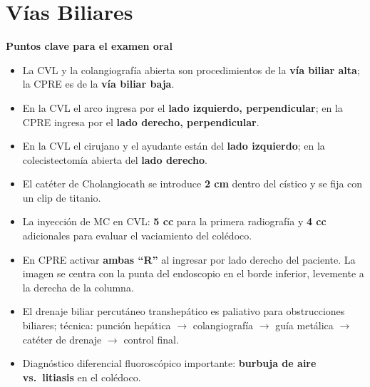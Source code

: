 
\chapter{Vías Biliares}

\begin{cajakeypoints}
	\textbf{\color{azulprincipal} Puntos clave para el examen oral}
	\begin{itemize}[noitemsep, topsep=2pt]
		\item La CVL y la colangiografía abierta son procedimientos de la \textbf{vía biliar alta}; la CPRE es de la \textbf{vía biliar baja}.
		\item En la CVL el arco ingresa por el \textbf{lado izquierdo, perpendicular}; en la CPRE ingresa por el \textbf{lado derecho, perpendicular}.
		\item En la CVL el cirujano y el ayudante están del \textbf{lado izquierdo}; en la colecistectomía abierta del \textbf{lado derecho}.
		\item El catéter de Cholangiocath se introduce \textbf{2 cm} dentro del cístico y se fija con un clip de titanio.
		\item La inyección de MC en CVL: \textbf{5 cc} para la primera radiografía y \textbf{4 cc} adicionales para evaluar el vaciamiento del colédoco.
		\item En CPRE activar \textbf{ambas ``R''} al ingresar por lado derecho del paciente. La imagen se centra con la punta del endoscopio en el borde inferior, levemente a la derecha de la columna.
		\item El drenaje biliar percutáneo transhepático es paliativo para obstrucciones biliares; técnica: punción hepática $\to$ colangiografía $\to$ guía metálica $\to$ catéter de drenaje $\to$ control final.
		\item Diagnóstico diferencial fluoroscópico importante: \textbf{burbuja de aire vs.\ litiasis} en el colédoco.
	\end{itemize}
\end{cajakeypoints}

\vspace{1em}

